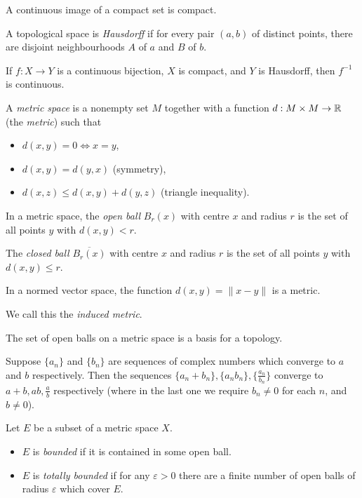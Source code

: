 \begin{prop}
    A continuous image of a compact set is compact.
\end{prop}
\begin{defn}
    A topological space is \emph{Hausdorff} if for every pair $(a,b)$ of
    distinct points, there are disjoint neighbourhoods $A$ of $a$ and $B$ of $b$.
\end{defn}
\begin{prop}
    If $f:X\to Y$ is a continuous bijection, $X$ is compact, and $Y$ is
    Hausdorff, then $f^{-1}$ is continuous.
\end{prop}
\begin{defn}
  A \emph{metric space} is a nonempty set $M$ together with a function
  $d:M\times M\to\mathbb{R}$ (the \emph{metric}) such that
  \begin{itemize}
    \item $d(x,y)=0\iff x=y$,
    \item $d(x,y)=d(y,x)$ (symmetry), 
    \item $d(x,z)\le d(x,y)+d(y,z)$ (triangle inequality).
  \end{itemize}
\end{defn}
\begin{defn}
  In a metric space, the \emph{open ball} $B_r(x)$ with centre $x$ and radius $r$ is the
  set of all points $y$ with $d(x,y)<r$.

  The \emph{closed ball} $\overline{B_r(x)}$ with centre $x$ and radius $r$ is
  the set of all points $y$ with $d(x,y)\le r$.
\end{defn}
\begin{prop}
  In a normed vector space, the function $d(x,y)=\|x-y\|$ is a metric.
\end{prop}
\begin{defn}
  We call this the \emph{induced metric}.
\end{defn}
\begin{prop}
    The set of open balls on a metric space is a basis for a topology.
\end{prop}
\begin{prop}
  Suppose $\{a_n\}$ and $\{b_n\}$ are sequences of complex numbers which
  converge to $a$ and $b$ respectively. Then the sequences $\{a_n+b_n\},
  \{a_n b_n\},\{\frac{a_n}{b_n}\}$ converge to $a+b,ab,\frac ab$
  respectively (where in the last one we require $b_n\ne 0$ for each $n$, and
  $b\ne 0$).
\end{prop}
\begin{defn}
    Let $E$ be a subset of a metric space $X$.
    \begin{itemize}
        \item $E$ is \emph{bounded} if it is contained in some open ball.
        \item $E$ is \emph{totally bounded} if for any $\varepsilon>0$ there are a
            finite number of open balls of radius $\varepsilon$ which cover $E$.
    \end{itemize}
\end{defn}
